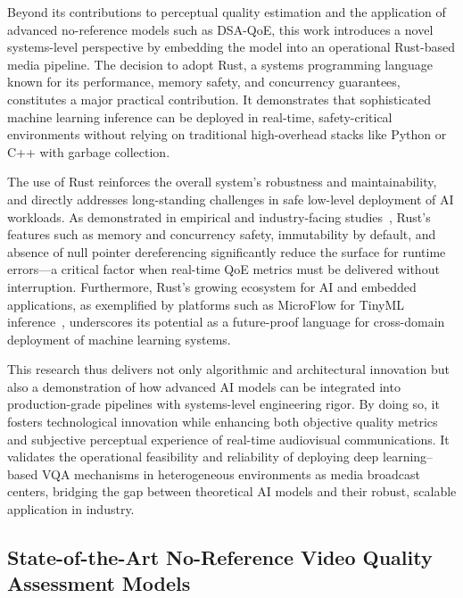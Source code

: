 Beyond its contributions to perceptual quality estimation and the application of advanced no-reference models such as DSA-QoE, this work introduces a novel systems-level perspective by embedding the model into an operational Rust-based media pipeline. The decision to adopt Rust, a systems programming language known for its performance, memory safety, and concurrency guarantees, constitutes a major practical contribution. It demonstrates that sophisticated machine learning inference can be deployed in real-time, safety-critical environments without relying on traditional high-overhead stacks like Python or C++ with garbage collection.

The use of Rust reinforces the overall system's robustness and maintainability, and directly addresses long-standing challenges in safe low-level deployment of AI workloads. As demonstrated in empirical and industry-facing studies~\cite{fulton2022benefits}, Rust's features such as memory and concurrency safety, immutability by default, and absence of null pointer dereferencing significantly reduce the surface for runtime errors---a critical factor when real-time QoE metrics must be delivered without interruption. Furthermore, Rust's growing ecosystem for AI and embedded applications, as exemplified by platforms such as MicroFlow for TinyML inference~\cite{carnelos2025microflow}, underscores its potential as a future-proof language for cross-domain deployment of machine learning systems.

This research thus delivers not only algorithmic and architectural innovation but also a demonstration of how advanced AI models can be integrated into production-grade pipelines with systems-level engineering rigor. By doing so, it fosters technological innovation while enhancing both objective quality metrics and subjective perceptual experience of real-time audiovisual communications. It validates the operational feasibility and reliability of deploying deep learning–based VQA mechanisms in heterogeneous environments as media broadcast centers, bridging the gap between theoretical AI models and their robust, scalable application in industry.

\subsection{State-of-the-Art No-Reference Video Quality Assessment Models}

